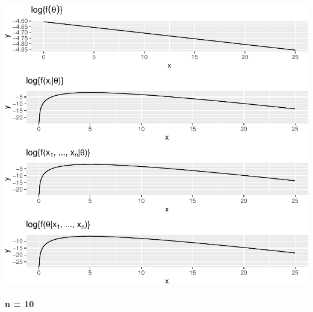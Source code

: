 \documentclass[]{article}
\let\oldparagraph\paragraph
\renewcommand{\paragraph}[1]{\oldparagraph{#1}\mbox{}}
\begin{document}
\includegraphics{20190306_log_posterior_contributions_files/figure-latex/unnamed-chunk-2-1.pdf}

\newpage

\paragraph{n = 10}\label{n-10}
\end{document}
